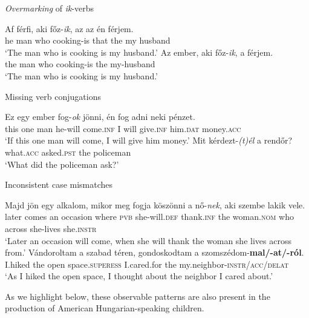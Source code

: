 \documentclass[output=paper,colorlinks,citecolor=brown,footheight=42pt]{langscibook}
\begin{document}
\begin{exe}
\ex \textit{Overmarking} of \textit{ik}-verbs \label{overikverbs}
\begin{xlist}
\ex \gll Af f\'{e}rfi, aki f\H{o}z-\emph{ik}, az az \'{e}n f\'{e}rjem. \\
he man who cooking-is that the my husband \\
\glt `The man who is cooking is my husband.' 
\ex \gll Az ember, aki f\H{o}z-\emph{ik}, a f\'{e}rjem. \\
the man who cooking-is the my-husband \\
\glt `The man who is cooking is my husband.' 
\end{xlist}


\ex Missing verb conjugations \label{missingverbconj}
\begin{xlist}
\ex \gll Ez egy ember fog-\textit{ok} j\"{o}nni, \'{e}n fog adni neki p\'{e}nzet. \\
this one man he-will come.\textsc{inf} I will give.\textsc{inf} him.\textsc{dat} money.\textsc{acc} \\
\glt `If this one man will come, I will give him money.' 
\ex \gll Mit k\'{e}rdezt-\textit{(t)\'{e}l} a rend\H{o}r? \\ what.\textsc{acc} asked.\textsc{pst} the policeman \\
\glt `What did the policeman ask?' 
\end{xlist}


\ex Inconsistent case mismatches \label{inconsistentcase}
\begin{xlist}
\ex \gll Majd j\"{o}n egy alkalom, mikor meg fogja k\"{o}sz\"{o}nni a n\H{o}-\textit{nek}, aki szembe lakik vele. \\
later comes an occasion where \textsc{pvb} she-will.\textsc{def} thank.\textsc{inf} the woman.\textsc{nom} who across she-lives she.\textsc{instr} \\
\glt `Later an occasion will come, when she will thank the woman she lives across from.' 
\ex \gll Vándoroltam a szabad t\'{e}ren, gondoskodtam a szomsz\'{e}dom-\textbf{mal/-at/-r\'{o}l}. \\
I.hiked the open space.\textsc{superess} I.cared.for the my.neighbor-\textsc{instr}/\textsc{acc}/\textsc{delat} \\
\glt `As I hiked the open space, I thought about the neighbor I cared about.' 
\end{xlist}
\end{exe}


As we highlight below, these observable patterns are also present in the production of American Hungarian-speaking children. 
\end{document}
